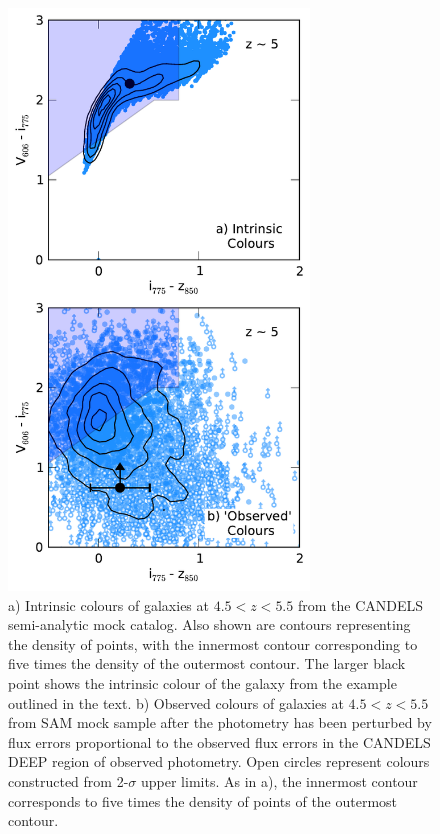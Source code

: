 \begin{figure}
\centering
\includegraphics[width=80mm]{plots/figA1.pdf}
\caption[a) Intrinsic colours of galaxies at $4.5 < z < 5.5$ from the CANDELS semi-analytic mock catalog. b) Observed colours of galaxies at $4.5 < z < 5.5$ from SAM mock sample after the photometry has been perturbed by flux errors proportional to the observed flux errors in the CANDELS DEEP region of observed photometry.]{a) Intrinsic colours of galaxies at $4.5 < z < 5.5$ from the CANDELS semi-analytic mock catalog. Also shown are contours representing the density of points, with the innermost contour corresponding to five times the density of the outermost contour. The larger black point shows the intrinsic colour of the galaxy from the example outlined in the text. b) Observed colours of galaxies at $4.5 < z < 5.5$ from SAM mock sample after the photometry has been perturbed by flux errors proportional to the observed flux errors in the CANDELS DEEP region of observed photometry. Open circles represent colours constructed from 2-$\sigma$ upper limits. As in a), the innermost contour corresponds to five times the density of points of the outermost contour.}
\label{fig:mock_col}
\end{figure}

